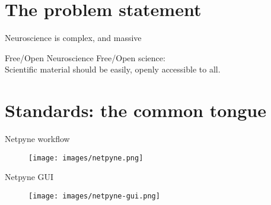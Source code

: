 \section{The problem statement}
\begin{frame}[c]{Neuroscience is complex, and massive}
  \begin{figure}[h]
    \centering
  \end{figure}
\end{frame}
\begin{frame}[c]{Free/Open Neuroscience}
  Free/Open science:\\Scientific material should be easily, openly \alert{accessible to all}.
\end{frame}
{
  
}
\section{Standards: the common tongue}
{
  
  
  
  
}
\begin{frame}[c]{Netpyne workflow}
  \begin{figure}[h]
    \centering
    \texttt{[image: images/netpyne.png]}
  \end{figure}
\end{frame}
\begin{frame}[c]{Netpyne GUI}
  \begin{figure}[h]
    \centering
    \texttt{[image: images/netpyne-gui.png]}
  \end{figure}
\end{frame}
{
  
}
